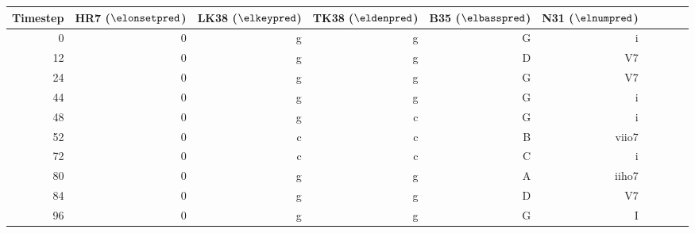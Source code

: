 \begin{tabular}{r|rrrrrrrrr}
Timestep & HR7 ($\elonsetpred$) & LK38 ($\elkeypred$) & TK38 ($\eldenpred$) & B35 ($\elbasspred$)  & N31 ($\elnumpred$)  \\ \hline
0        & 0                    & g                   & g                   & G                    & i                   \\
12       & 0                    & g                   & g                   & D                    & V7                  \\
24       & 0                    & g                   & g                   & G                    & V7                  \\
44       & 0                    & g                   & g                   & G                    & i                   \\ \hline
48       & 0                    & g                   & c                   & G                    & i                   \\
52       & 0                    & c                   & c                   & B                    & viio7               \\
72       & 0                    & c                   & c                   & C                    & i                   \\
80       & 0                    & g                   & g                   & A                    & iiho7               \\
84       & 0                    & g                   & g                   & D                    & V7                  \\
96       & 0                    & g                   & g                   & G                    & I                   \\
\end{tabular}
